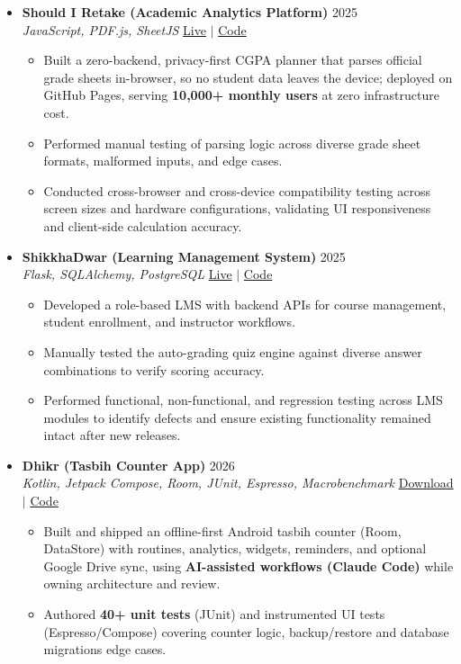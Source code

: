 \documentclass[a4paper]{article}
\newcommand{\resumeItem}[1]{
  \item\small{
    {#1 \vspace{-2pt}}
  }
}
\newcommand{\resumeItemListStart}{\begin{itemize}}
\newcommand{\resumeItemListEnd}{\end{itemize}\vspace{-5pt}}
\begin{document}
  \begin{itemize}[leftmargin=0.15in, label={}, itemsep=3pt]

    \item
    \textbf{Should I Retake (Academic Analytics Platform)} \hfill 2025\\
    \small\textit{JavaScript, PDF.js, SheetJS} \hfill
    \href{https://badhon495.github.io/should-i-retake/}{Live} $|$
    \href{https://github.com/badhon495/should-i-retake}{Code}
    \vspace{-5pt}
    \resumeItemListStart
      \resumeItem{Built a zero-backend, privacy-first CGPA planner that parses official grade sheets in-browser, so no student data leaves the device; deployed on GitHub Pages, serving \textbf{10,000+ monthly users} at zero infrastructure cost.}
\resumeItem{Performed manual testing of parsing logic across diverse grade sheet formats, malformed inputs, and edge cases.}
\resumeItem{Conducted cross-browser and cross-device compatibility testing across screen sizes and hardware configurations, validating UI responsiveness and client-side calculation accuracy.}
    \resumeItemListEnd

    \item
    \textbf{ShikkhaDwar (Learning Management System)} \hfill 2025\\
    \small\textit{Flask, SQLAlchemy, PostgreSQL} \hfill
    \href{https://shikkhadwar-81r2.onrender.com/}{Live} $|$
    \href{https://github.com/nihal-kabir/ShikkhaDwar}{Code}
    \vspace{-5pt}
\resumeItemListStart
    \resumeItem{Developed a role-based LMS with backend APIs for course management, student enrollment, and instructor workflows.}
    \resumeItem{Manually tested the auto-grading quiz engine against diverse answer combinations to verify scoring accuracy.}
    \resumeItem{Performed functional, non-functional, and regression testing across LMS modules to identify defects and ensure existing functionality remained intact after new releases.}
\resumeItemListEnd
    \item
    \textbf{Dhikr (Tasbih Counter App)} \hfill 2026\\
    \small\textit{Kotlin, Jetpack Compose, Room, JUnit, Espresso, Macrobenchmark} \hfill
    \href{https://github.com/badhon495/Dhikr/releases/latest}{Download} $|$
    \href{https://github.com/badhon495/Dhikr}{Code}
    \vspace{-5pt}
    \resumeItemListStart
      \resumeItem{Built and shipped an offline-first Android tasbih counter (Room, DataStore) with routines, analytics, widgets, reminders, and optional Google Drive sync, using \textbf{AI-assisted workflows (Claude Code)} while owning architecture and review.}
      \resumeItem{Authored \textbf{40+ unit tests} (JUnit) and instrumented UI tests (Espresso/Compose) covering counter logic, backup/restore and database migrations edge cases.}
    \resumeItemListEnd


\end{itemize}
\end{document}
